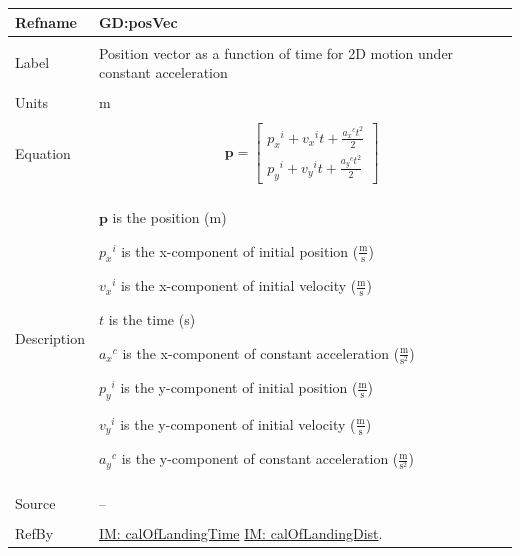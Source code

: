 \documentclass[12pt]{article}
\begin{document}
\noindent \begin{minipage}{\textwidth}
\begin{tabular}{p{} p{}}
\toprule \textbf{Refname} & \textbf{GD:posVec}
\label{GD:posVec}
\\ \midrule \\
Label & Position vector as a function of time for 2D motion under constant acceleration
\\ \midrule \\
Units & m
\\ \midrule \\
Equation & \begin{displaymath}
           \mathbf{p}=\begin{bmatrix}
{{p_{x}}^{i}}+{{v_{x}}^{i}} t+\frac{{{a_{x}}^{c}} t^{2}}{2}\\
{{p_{y}}^{i}}+{{v_{y}}^{i}} t+\frac{{{a_{y}}^{c}} t^{2}}{2}
\end{bmatrix}
           \end{displaymath}
\\ \midrule \\
Description & \begin{symbDescription}
              \item{$\mathbf{p}$ is the position (m)}
              \item{${{p_{x}}^{i}}$ is the x-component of initial position ($\frac{\text{m}}{\text{s}}$)}
              \item{${{v_{x}}^{i}}$ is the x-component of initial velocity ($\frac{\text{m}}{\text{s}}$)}
              \item{$t$ is the time (s)}
              \item{${{a_{x}}^{c}}$ is the x-component of constant acceleration ($\frac{\text{m}}{\text{s}^{2}}$)}
              \item{${{p_{y}}^{i}}$ is the y-component of initial position ($\frac{\text{m}}{\text{s}}$)}
              \item{${{v_{y}}^{i}}$ is the y-component of initial velocity ($\frac{\text{m}}{\text{s}}$)}
              \item{${{a_{y}}^{c}}$ is the y-component of constant acceleration ($\frac{\text{m}}{\text{s}^{2}}$)}
              \end{symbDescription}
\\ \midrule \\
Source & --
\\ \midrule \\
RefBy & \hyperref[IM:calOfLandingTime]{IM: calOfLandingTime} \hyperref[IM:calOfLandingDist]{IM: calOfLandingDist}.
\\ \bottomrule \end{tabular}
\end{minipage}
\end{document}
